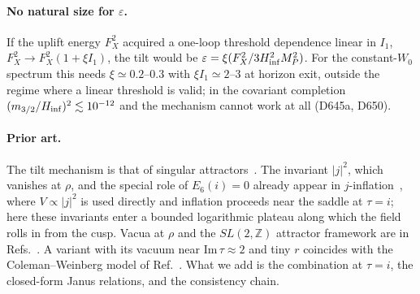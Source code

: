 \documentclass[aps,prd,twocolumn,superscriptaddress,nofootinbib,floatfix]{revtex4-2}
\begin{document}
\paragraph{No natural size for $\varepsilon$.} If the uplift energy $F_X^2$ acquired a one-loop threshold dependence linear in $I_1$, $F_X^2\to F_X^2(1+\xi I_1)$, the tilt would be $\varepsilon=\xi(F_X^2/3H_{\rm inf}^2M_P^2)$. For the constant-$W_0$ spectrum this needs $\xi\simeq0.2$--$0.3$ with $\xi I_1\simeq2$--$3$ at horizon exit, outside the regime where a linear threshold is valid; in the covariant completion $(m_{3/2}/H_{\rm inf})^2\lesssim10^{-12}$ and the mechanism cannot work at all (D645a, D650).

\paragraph{Prior art.} The tilt mechanism is that of singular attractors~\cite{arXiv_2512_02969}. The invariant $|j|^2$, which vanishes at $\rho$, and the special role of $E_6(i)=0$ already appear in $j$-inflation~\cite{arXiv_1612_09559}, where $V\propto|j|^2$ is used directly and inflation proceeds near the saddle at $\tau=i$; here these invariants enter a bounded logarithmic plateau along which the field rolls in from the cusp. Vacua at $\rho$ and the $SL(2,\mathbb{Z})$ attractor framework are in Refs.~\cite{arXiv_2408_05203,arXiv_2412_19324}. A variant with its vacuum near $\mathrm{Im}\,\tau \approx 2$ and tiny $r$ coincides with the Coleman--Weinberg model of Ref.~\cite{arXiv_2607_00528}. What we add is the combination at $\tau = i$, the closed-form Janus relations, and the consistency chain.
\end{document}
